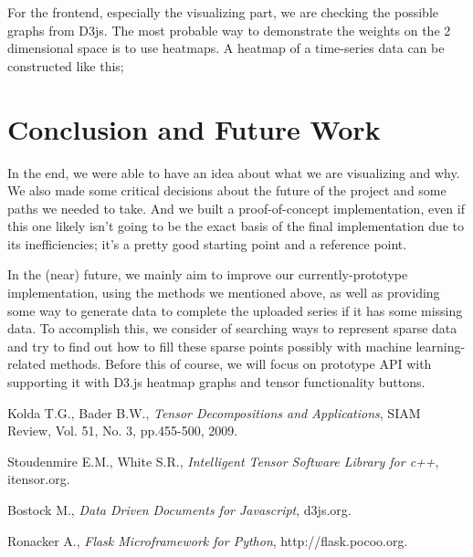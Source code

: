 \documentclass[11pt]{article}
\begin{document}
For the frontend, especially the visualizing part, we are checking the possible graphs from D3js\cite{d3}. The most probable way to demonstrate the weights on the 2 dimensional space is to use heatmaps. A heatmap of a time-series data can be constructed like this;

\noindent{}

\section {Conclusion and Future Work} 

In the end, we were able to have an idea about what we are visualizing and why. We also made some critical decisions about the future of the project and some paths we needed to take. And we built a proof-of-concept implementation, even if this one likely isn't going to be the exact basis of the final implementation due to its inefficiencies; it's a pretty good starting point and a reference point.

In the (near) future, we mainly aim to improve our currently-prototype implementation, using the methods we mentioned above, as well as providing some way to generate data to complete the uploaded series if it has some missing data. To accomplish this, we consider of searching ways to represent sparse data and try to find out how to fill these sparse points possibly with machine learning-related methods. Before this of course, we will focus on prototype API with supporting it with D3.js heatmap graphs and tensor functionality buttons. 


\newpage 

\begin{thebibliography}{9}

  Kolda T.G., Bader B.W.,
  \emph{Tensor Decompositions and Applications},
  SIAM Review,
  Vol. 51, No. 3, pp.455-500,
  2009.

  Stoudenmire E.M., White S.R.,
  \emph{Intelligent Tensor Software Library for c++},
  itensor.org.
  
    Bostock M.,
    \emph{Data Driven Documents for Javascript},
    d3js.org.
    
    Ronacker A.,
    \emph{Flask Microframework for Python},
    http://flask.pocoo.org.

\end{thebibliography}
\end{document}
